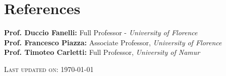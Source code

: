 \documentclass[11pt, a4paper]{moderncv}
\begin{document}
\section*{References}

\textbf{Prof. Duccio Fanelli:} Full Professor - \textit{University of Florence}\\[0.3em]
\textbf{Prof. Francesco Piazza:} Associate Professor, \textit{University of Florence}\\[0.3em]
\textbf{Prof. Timoteo Carletti:} Full Professor, \textit{University of Namur}\\[0.3em]


\vfill

\begin{flushright}
\textsc{Last updated on:} \today\\
\end{flushright}
\end{document}

